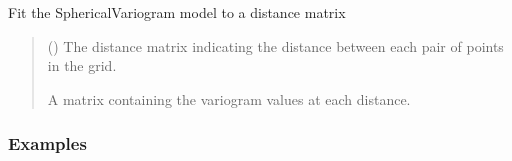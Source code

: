 \documentclass[letterpaper,10pt,english]{sphinxmanual}
\begin{document}
\begin{fulllineitems}
\begin{quote}
\begin{description}
\begin{itemize}
\end{itemize}

\end{description}\end{quote}

\begin{fulllineitems}
\label{\detokenize{covariance:glomar_gridding.variogram.SphericalVariogram.fit}}
\pysigstartsignatures
\pysiglinewithargsret
{}
{}
{}
\pysigstopsignatures
\sphinxAtStartPar
Fit the SphericalVariogram model to a distance matrix
\begin{quote}\begin{description}
\sphinxAtStartPar
{} () \textendash{} The distance matrix indicating the distance between each pair of
points in the grid.

\sphinxAtStartPar
A matrix containing the variogram values at each distance.

\sphinxAtStartPar
{}

\end{description}\end{quote}
\subsubsection*{Examples}

\begin{sphinxVerbatim}[commandchars=\\\{\}]
  
\end{sphinxVerbatim}

\end{fulllineitems}


\end{fulllineitems}
\end{document}
